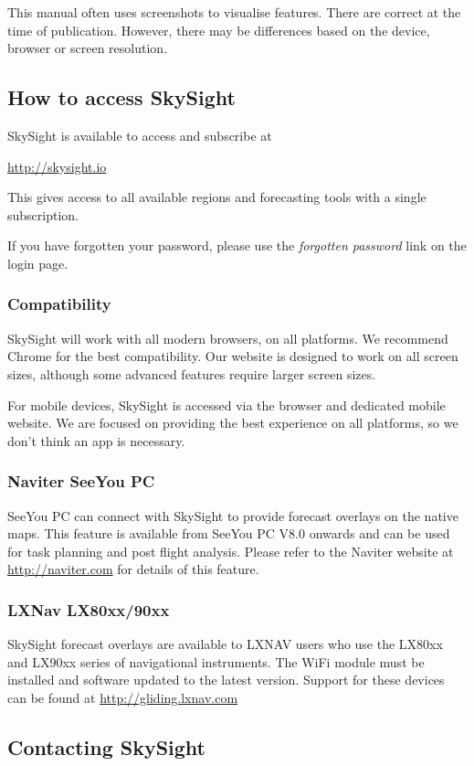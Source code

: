 \documentclass[11pt,a4paper]{article}
\begin{document}
This manual often uses screenshots to visualise features. There are correct at the time of publication. However, there may be differences based on the device, browser or screen resolution.

\subsection{How to access SkySight}
SkySight is available to access and subscribe at

\url{http://skysight.io}

This gives access to all available regions and forecasting tools with a single subscription.

If you have forgotten your password, please use the \emph{forgotten password} link on the login page.


\subsubsection{Compatibility}
SkySight will work with all modern browsers, on all platforms. We recommend Chrome for the best compatibility. Our website is designed to work on all screen sizes, although some advanced features require larger screen sizes.

For mobile devices, SkySight is accessed via the browser and dedicated mobile website. We are focused on providing the best experience on all platforms, so we don't think an app is necessary.

\subsubsection{Naviter SeeYou PC}
SeeYou PC can connect with SkySight to provide forecast overlays on the native maps. This feature is available from SeeYou PC V8.0 onwards and can be used for task planning and post flight analysis. Please refer to the Naviter website at \url{http://naviter.com} for details of this feature.
\subsubsection{LXNav LX80xx/90xx}
SkySight forecast overlays are available to LXNAV users who use the LX80xx and LX90xx series of navigational instruments. The WiFi module must be installed and software updated to the latest version. Support for these devices can be found at \url{http://gliding.lxnav.com}
\subsection{Contacting SkySight}
\end{document}
